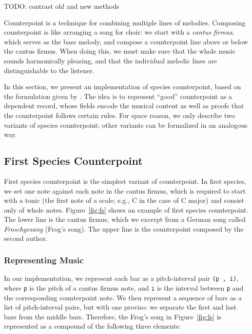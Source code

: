 TODO: contrast old and new methods

Counterpoint is a technique for combining multiple lines of melodies.
Composing counterpoint is like arranging a song for choir:
we start with a \emph{cantus firmus}, which serves as the base melody,
and compose a counterpoint line above or below the cantus firmus.
When doing this, we must make sure that the whole music sounds
harmonically pleasing, and that the individual melodic lines are
distinguishable to the listener.

In this section, we present an implementation of species counterpoint,
based on the formulation given by \citet{fux-cp}.
The idea is to represent ``good'' counterpoint  as a dependent record,
whose fields encode the musical content as well as proofs that the
counterpoint follows certain rules.
For space reason, we only describe two variants of species counterpoint;
other variants can be formalized in an analogous way.

\subsection{First Species Counterpoint}
\label{sec:cp:fs}

\FS

First species counterpoint is the simplest variant of counterpoint.
In first species, we set one note against each note in the cantus firmus,
which is required to start with a tonic (the first note of a scale;
e.g., C in the case of C major) and consist only of whole notes.
Figure~\ref{fig:fs} shows an example of first species counterpoint.
The lower line is the cantus firmus, which we excerpt from a German
song called \emph{Froschgesang} (Frog's song).
The upper line is the counterpoint composed by the second author.

\subsubsection{Representing Music}

In our implementation, we represent each bar as a pitch-interval pair
\texttt{(p ,  i)}, where \texttt{p} is the pitch of a cantus firmus note,
and \texttt{i} is the interval between \texttt{p} and the corresponding
counterpoint note.
We then represent a sequence of bars as a list of pitch-interval pairs,
but with one proviso: we separate the first and last bars from the
middle bars.
Therefore, the Frog's song in Figure~\ref{fig:fs} is represented as a
compound of the following three elements:

